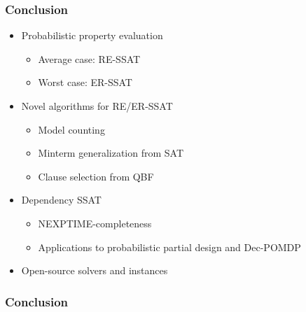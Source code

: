 \begin{frame}
      \frametitle{Conclusion}
      \begin{itemize}
            \item Probabilistic property evaluation
                  \begin{itemize}
                        \item Average case: RE-SSAT
                        \item Worst case: ER-SSAT
                  \end{itemize}
                  \pause
            \item Novel algorithms for RE/ER-SSAT
                  \begin{itemize}
                        \item Model counting
                        \item Minterm generalization from SAT
                        \item Clause selection from QBF
                  \end{itemize}
                  \pause
            \item Dependency SSAT
                  \begin{itemize}
                        \item NEXPTIME-completeness
                        \item Applications to probabilistic partial design and Dec-POMDP
                  \end{itemize}
                  \pause
            \item Open-source solvers and instances
      \end{itemize}
\end{frame}

\begin{frame}
      \frametitle{Conclusion}
      \begin{figure}
            \centering
            
      \end{figure}
\end{frame}

